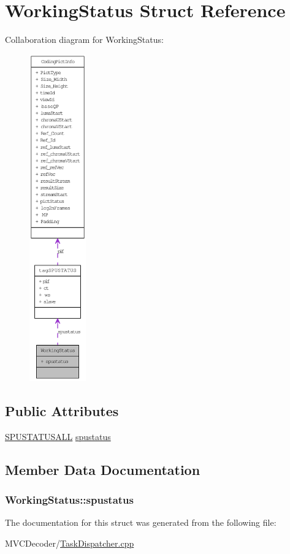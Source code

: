 \hypertarget{struct_working_status}{
\section{WorkingStatus Struct Reference}
\label{struct_working_status}
}


Collaboration diagram for WorkingStatus:\nopagebreak
\begin{figure}[H]
\begin{center}
\leavevmode
\includegraphics[height=400pt]{struct_working_status__coll__graph}
\end{center}
\end{figure}
\subsection*{Public Attributes}
\begin{DoxyCompactItemize}
\item 
\hyperlink{_task_dispatcher_8cpp_a15a4699036bd1e013ed749094a8fca9b}{SPUSTATUSALL} \hyperlink{struct_working_status_a2f406a85ec2bf9b4b9c25eb8052e4fb3}{spustatus}
\end{DoxyCompactItemize}


\subsection{Member Data Documentation}
\hypertarget{struct_working_status_a2f406a85ec2bf9b4b9c25eb8052e4fb3}{
\subsubsection[{spustatus}]{ {\bf WorkingStatus::spustatus}}}
\label{struct_working_status_a2f406a85ec2bf9b4b9c25eb8052e4fb3}


The documentation for this struct was generated from the following file:\begin{DoxyCompactItemize}
\item 
MVCDecoder/\hyperlink{_task_dispatcher_8cpp}{TaskDispatcher.cpp}\end{DoxyCompactItemize}
